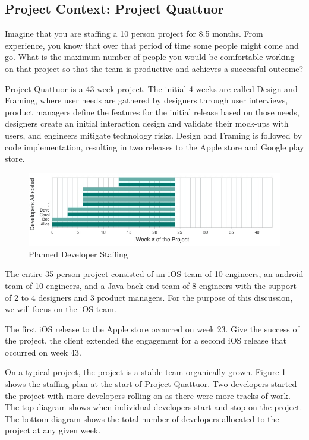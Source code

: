 \subsection{Project Context: Project Quattuor}
\label{ExampleInAction}
Imagine that you are staffing a 10 person project for 8.5 months. From experience, you know that over that period of time some people might come and go. What is the maximum number of people you would be comfortable working on that project so that the team is productive and achieves a successful outcome?  

Project Quattuor is a 43 week project. The initial 4 weeks are called Design and Framing, where user needs are gathered by designers through user interviews, product managers define the features for the initial release based on those needs, designers create an initial interaction design and validate their mock-ups with users, and engineers mitigate technology risks. Design and Framing is followed by code implementation, resulting in two releases to the Apple store and Google play store.

\begin{figure}[t]
\centering
\includegraphics[width=7.1in]{OriginalDeveloperStaffingV2.jpg}
\caption{Planned Developer Staffing}
\label{PlannedDeveloperStaffing}
\end{figure}

The entire 35-person project consisted of an iOS team of 10 engineers, an android team of 10 engineers, and a Java back-end team of 8 engineers with the support of 2 to 4 designers and 3 product managers. For the purpose of this discussion, we will focus on the iOS team. 

The first iOS release to the Apple store occurred on week 23. Give the success of the project, the client extended the engagement for a second iOS release that occurred on week 43. 

On a typical project, the project is a stable team organically grown. Figure \ref{PlannedDeveloperStaffing} shows the staffing plan at the start of Project Quattuor. Two developers started the project with more developers rolling on as there were more tracks of work. The top diagram shows when individual developers start and stop on the project. The bottom diagram shows the total number of developers allocated to the project at any given week. 

